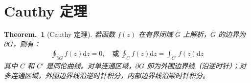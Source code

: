 \documentclass[UTF8]{report}
\theoremstyle{MyLineTheoremStyle} %
\theoremstyle{MyBlockTheoremStyle} %
\newtheorem{BlockTheorem}[LineTheorem]{Theorem.\,} %
\theoremstyle{MySubsubsectionStyle} %
\begin{document}
\section{Cauthy 定理}
\begin{BlockTheorem}[Cauthy 定理]\label{Cauthy 定理}
若函数 $f(z)$ 在有界闭域 $\overline{G}$ 上解析，$\overline{G}$ 的边界为 $\partial G $，则有：
\begin{gather}
\oint_{\partial G} f(z) \mathrm{d}z = 0 ,\quad \text{或}\ \oint_{C} f(z)\mathrm{d}z = \int_{C'} f(z)\mathrm{d}z
\end{gather}
其中 $C$ 和 $C'$ 是同伦曲线。对单连通区域，$\partial G$ 即为外围边界线（沿逆时针）；对多连通区域，外围边界线沿逆时针积分，内部边界线沿顺时针积分。
\end{BlockTheorem}
\end{document}
